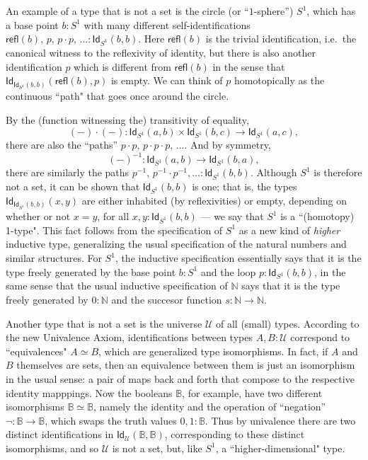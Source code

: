 \documentclass[11pt]{article}
\newcommand{\B}{\ensuremath{\mathbb{B}}}
\newcommand{\N}{\ensuremath{\mathbb{N}}}
\newcommand{\Id}{\mathsf{Id}}
\newcommand{\id}[1]{\Id_{#1}}
\newcommand{\refl}{\mathsf{refl}}
\newcommand{\U}{\ensuremath{\mathcal{U}}}
\theoremstyle{remark}
\theoremstyle{definition}
\begin{document}
 An example of a type that is not a set is the circle (or ``$1$-sphere'') $S^1$, which has a base point $b: S^1$ with many different self-identifications $\refl(b),\, p,\, p\cdot p,\, ... :\id{S^1}(b,b)$.  Here $\refl(b)$ is the trivial identification, i.e.\ the canonical witness to the reflexivity of identity, but there is also another identification $p$ which is different from $\refl(b)$ in the sense that $\id{\id{S^1}(b,b)}(\refl(b), p)$ is empty.  We can think of $p$ homotopically as the continuous ``path" that goes once around the circle. 

%
%
By the (function witnessing the) transitivity of equality, 
\[
(-)\cdot(-) : \id{S^1}(a,b) \times \id{S^1}(b,c)\to \id{S^1}(a,c),
\]
 there are also the ``paths'' $p\cdot p,\, p\cdot p\cdot p,\, \ldots$.   And by symmetry,
 \[
 (-)^{-1}:\id{S^1}(a,b) \to \id{S^1}(b,a),
 \]
 there are similarly the paths $p^{-1},\, p^{-1}\cdot p^{-1}, \ldots :\id{S^1}(b,b)$.  Although $S^1$ is therefore not a set, it can be shown that $\id{S^1}(b,b)$ is one; that is, the types $\id{\id{S^1}(b,b)}(x,y)$ are either inhabited (by reflexivities) or empty, depending on whether or not $x=y$, for all $x,y : \id{S^1}(b,b)$ --- we say that $S^1$ is a ``(homotopy) 1-type".  This fact follows from the specification of $S^1$ as a new kind of \emph{higher} inductive type, generalizing the usual specification of the natural numbers and similar structures.  For $S^1$, the inductive specification essentially says that it is the type freely generated by the base point $b:S^1$ and the loop $p:\id{S^1}(b,b)$, in the same sense that the usual inductive specification of $\N$ says that it is the type freely generated by $0:\N$ and the succesor function $s:\N\to\N$.  
  
 Another type that is not a set is the universe $\U$ of all (small) types.  According to the new Univalence Axiom, identifications between types $A,B:\U$ correspond to ``equivalences" $A\simeq B$, which are generalized type isomorphisms.  In fact, if $A$ and $B$ themselves are sets, then an equivalence between them is just an isomorphism in the usual sense: a pair of maps back and forth that compose to the respective identity mapppings.  Now the booleans $\B$, for example, have two different isomorphisms $\B\simeq \B$, namely the identity and the operation of ``negation'' $\neg:\B\to\B$, which swaps the truth values $0,1:\B$.  Thus by univalence there are two distinct identifications in $\id{\U}(\B,\B)$, corresponding to these distinct isomorphisms, and so $\U$ is not a set, but, like $S^1$, a ``higher-dimensional" type.  
 
\end{document}
